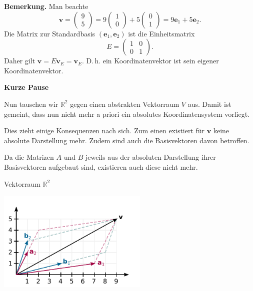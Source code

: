 \documentclass[9pt]{beamer}
\newcommand{\bv}[1]{\mathbf{#1}}
\newcommand{\R}{\mathbb R}
\newcommand{\strong}[1]{\textsf{\textbf{#1}}}
\begin{document}
\begin{frame}
\strong{Bemerkung.} Man beachte
\[\bv v = \begin{pmatrix}9\\ 5\end{pmatrix} = 
9\begin{pmatrix}1\\ 0\end{pmatrix} + 5\begin{pmatrix}0\\ 1\end{pmatrix}
= 9\bv e_1 + 5\bv e_2.\]\pause
Die Matrix zur Standardbasis $(\bv e_1,\bv e_2)$
ist die Einheitsmatrix
\[E=\begin{pmatrix}1 & 0\\ 0 & 1\end{pmatrix}.
\]\pause
Daher gilt $\bv v = E\bv v_E = \bv v_E$. D.\,h. ein Koordinatenvektor
ist sein eigener Koordinatenvektor. 
\end{frame}

\begin{frame}
\begin{center}
\strong{Kurze Pause}
\end{center}
\end{frame}

\begin{frame}
Nun tauschen wir $\R^2$ gegen einen abstrakten Vektorraum $V$ aus.
Damit ist gemeint, dass nun nicht mehr a priori ein absolutes
Koordinatensystem vorliegt.\pause

\vspace{0.8em}
Dies zieht einige Konsequenzen nach sich. Zum einen existiert für
$\bv v$ keine absolute Darstellung mehr. Zudem sind auch die
Basisvektoren davon betroffen.\pause

\vspace{0.8em}
Da die Matrizen $A$ und $B$ jeweils aus der absoluten Darstellung
ihrer Basisvektoren aufgebaut sind, existieren auch diese nicht mehr.
\end{frame}

\begin{frame}
\begin{center}Vektorraum $\R^2$\end{center}

\vspace{-2em}
\begin{center}
\includegraphics[width=72mm]{img/Vektor-in-Basis-BA.pdf}
\end{center}
\end{frame}
\end{document}
